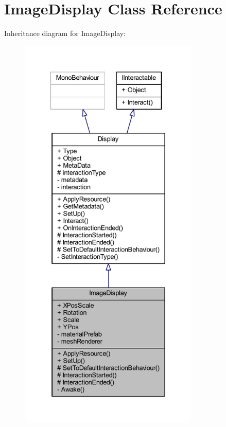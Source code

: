 \hypertarget{class_image_display}{}\section{Image\+Display Class Reference}
\label{class_image_display}


Inheritance diagram for Image\+Display\+:
\nopagebreak
\begin{figure}[H]
\begin{center}
\leavevmode
\includegraphics[height=550pt]{class_image_display__inherit__graph}
\end{center}
\end{figure}


